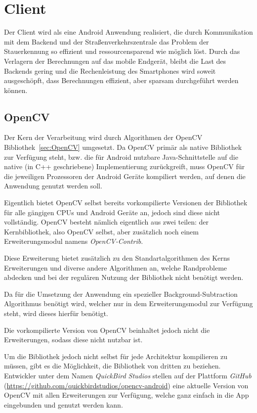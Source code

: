 \section{Client}
Der Client wird als eine Android Anwendung realisiert, die durch Kommunikation mit dem Backend und der Straßenverkehrszentrale das Problem der Stauerkennung so effizient und ressourcensparend wie möglich löst.
Durch das Verlagern der Berechnungen auf das mobile Endgerät, bleibt die Last des Backends gering und die Rechenleistung des Smartphones wird soweit ausgeschöpft, dass Berechnungen effizient, aber sparsam durchgeführt werden können.

\subsection{OpenCV}
Der Kern der Verarbeitung wird durch Algorithmen der OpenCV Bibliothek~\ref{sec:OpenCV} umgesetzt.
Da OpenCV primär als native Bibliothek zur Verfügung steht, bzw. die für Android nutzbare Java-Schnittstelle auf die native (in C++ geschriebene) Implementierung
zurückgreift, muss OpenCV für die jeweiligen Prozessoren der Android Geräte kompiliert werden, auf denen die Anwendung genutzt werden soll.

Eigentlich bietet OpenCV selbst bereits vorkompilierte Versionen der Bibliothek für alle gängigen CPUs und Android Geräte an, jedoch sind diese nicht vollständig.
OpenCV besteht nämlich eigentlich aus zwei teilen: der Kernbibliothek, also OpenCV selbst, aber zusätzlich noch einem Erweiterungsmodul namens {\em OpenCV-Contrib}.

Diese Erweiterung bietet zusätzlich zu den Standartalgorithmen des Kerns Erweiterungen und diverse andere Algorithmen an, welche Randprobleme abdecken und bei der regulären Nutzung der Bibliothek nicht benötigt werden.

Da für die Umsetzung der Anwendung ein spezieller Background-Subtraction Algorithmus benötigt wird, welcher nur in dem Erweiterungsmodul zur Verfügung steht, wird dieses hierfür benötigt.

Die vorkompilierte Version von OpenCV beinhaltet jedoch nicht die Erweiterungen, sodass diese nicht nutzbar ist.

Um die Bibliothek jedoch nicht selbst für jede Architektur kompilieren zu müssen, gibt es die Möglichkeit, die Bibliothek von dritten zu beziehen.
Entwickler unter dem Namen {\em QuickBird Studios} stellen auf der Plattform {\em GitHub} (\url{https://github.com/quickbirdstudios/opencv-android}) eine aktuelle Version von OpenCV mit allen Erweiterungen zur Verfügung, welche ganz einfach in die App eingebunden und genutzt werden kann.

